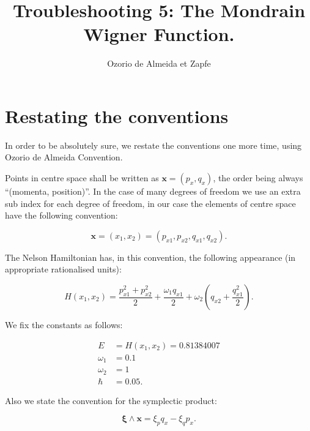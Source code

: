 \documentclass[a4paper,12pt]{article}
\title{ Troubleshooting 5: The Mondrain Wigner Function.}
\author{Ozorio de Almeida et Zapfe}
\newcommand{\xfase}{\mathbf{x}}
\newcommand{\xifase}{ {\boldsymbol{\xi}} }
\begin{document}
\maketitle

\section{Restating the conventions}

In order to be absolutely sure, we restate the conventions one more
time, using Ozorio de Almeida Convention.

Points in centre space shall be written as $\xfase=(p_x, q_x)$,
the order being always ``(momenta, position)''. In the case
of many degrees of freedom we use an extra sub index for
each degree of freedom, in our case the elements of centre
space have the following convention:

\begin{equation}\label{convencionpuntos}
\xfase=(x_1,x_2)=(p_{x1},p_{x2},q_{x1},q_{x2}).
\end{equation}

The Nelson Hamiltonian has, in this convention, the following
appearance (in appropriate rationalised units):

\begin{equation}
H(x_1,x_2)=\frac{p_{x1}^2+p_{x2}^2}{2}
+\frac{\omega_1 q_{x1}}{2} +\omega_2 (q_{x2}+\frac{q_{x1}^2}{2}).
\end{equation}

We fix the constants as follows:

\begin{align}
E & =H(x_1,x_2)=0.81384007 \\
\omega_1 &=0.1 \\
\omega_2 &=1 \\
\hbar &=0.05.
\end{align}

Also we state the convention for the symplectic product:

\begin{equation}
\xifase\wedge\xfase=\xi_p q_x -  \xi_q p_x.
\end{equation}
\end{document}
